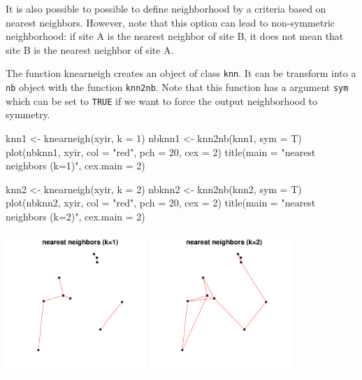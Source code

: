 \documentclass[a4paper]{article}
\begin{document}
It is also possible to possible to define neighborhood by a criteria based on nearest neighbors. However, note that this option can lead to non-symmetric neighborhood: if site A is the nearest neighbor of site B, it does not mean that site B is the nearest neighbor of site A.

The function knearneigh creates an object of class \texttt{knn}. It can be transform into a \texttt{nb} object with the function \texttt{knn2nb}. Note that this function has a argument \texttt{sym} which can be set to \texttt{TRUE} if we want to force the output neighborhood to symmetry.
\begin{Schunk}
\begin{Sinput}
 knn1 <- knearneigh(xyir, k = 1)
 nbknn1 <- knn2nb(knn1, sym = T)
 plot(nbknn1, xyir, col = "red", pch = 20, cex = 2)
 title(main = "nearest neighbors (k=1)", cex.main = 2)
\end{Sinput}
\end{Schunk}
\begin{Schunk}
\begin{Sinput}
 knn2 <- knearneigh(xyir, k = 2)
 nbknn2 <- knn2nb(knn2, sym = T)
 plot(nbknn2, xyir, col = "red", pch = 20, cex = 2)
 title(main = "nearest neighbors (k=2)", cex.main = 2)
\end{Sinput}
\end{Schunk}

\begin{center}
\includegraphics[width=0.4\textwidth,keepaspectratio]{figs/tutorial-ni10}
\includegraphics[width=0.4\textwidth,keepaspectratio]{figs/tutorial-ni11}
\end{center}
\end{document}
